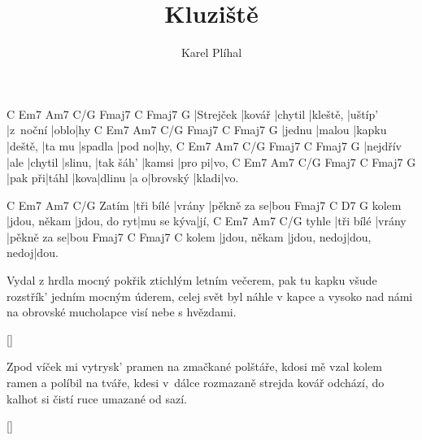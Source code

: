 \documentclass{song}
\author{Karel Plíhal}
\title{Kluziště}
\begin{document}
\strophe
C         Em7    Am7     C/G      Fmaj7   C        Fmaj7 G
|Strejček |kovář |chytil |kleště, |uštíp' |z~noční |oblo|hy
C      Em7    Am7    C/G     Fmaj7  C       Fmaj7 G
|jednu |malou |kapku |deště, |ta mu |spadla |pod no|hy,
C        Em7  Am7     C/G     Fmaj7     C      Fmaj7  G
|nejdřív |ale |chytil |slinu, |tak šáh' |kamsi |pro pi|vo,
C       Em7   Am7  C/G    Fmaj7 C      Fmaj7 G
|pak při|táhl |kova|dlinu |a o|brovský |kladi|vo.
\endstrophe

      C         Em7    Am7         C/G
Zatím |tři bílé |vrány |pěkně za se|bou
      Fmaj7        C            D7         G
kolem |jdou, někam |jdou, do ryt|mu se kýva|jí,
      C         Em7    Am7         C/G
tyhle |tři bílé |vrány |pěkně za se|bou
      Fmaj7        C           Fmaj7      C
kolem |jdou, někam |jdou, nedoj|dou, nedoj|dou.
\endstrophe

\strophe*
Vydal z hrdla mocný pokřik ztichlým letním večerem,
pak tu kapku všude rozstřík' jedním mocným úderem,
celej svět byl náhle v kapce a vysoko nad námi
na obrovské mucholapce visí nebe s hvězdami.
\endstrophe

\ref{}

\strophe*
Zpod víček mi vytrysk' pramen na zmačkané polštáře,
kdosi mě vzal kolem ramen a políbil na tváře,
kdesi v~dálce rozmazaně strejda kovář odchází,
do kalhot si čistí ruce umazané od sazí.
\endstrophe

\ref{}
\end{document}
